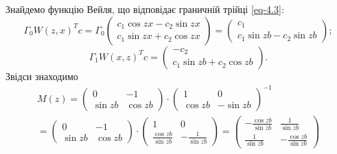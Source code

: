 \begin{example}
	Знайдемо функцію Вейля, що відповідає граничній трійці \eqref{eq-4.3}:
	\begin{equation*}
		\Gamma_0W(z,x)^T c = \Gamma_0
		\begin{pmatrix}
	  		c_1 \cos{zx} - c_2 \sin{zx}\\
	  		c_1 \sin{zx} + c_2 \cos{zx}
	  	\end{pmatrix}
	  	=
	  	\begin{pmatrix}
	  		c_1\\
	  		c_1 \sin{zb} - c_2 \sin{zb}
	  	\end{pmatrix};
	\end{equation*}
	\begin{equation*}
		\Gamma_1W(x,z)^T c = 
		\begin{pmatrix}
	  		-c_2\\
	  		c_1\sin{zb} + c_2 \cos{zb}
	  	\end{pmatrix}.
	\end{equation*}
	Звідси знаходимо
	\begin{multline}\label{eq-4.27}
		M(z) = 
		\begin{pmatrix}
	  		0 & -1\\
	  		\sin{zb} & \cos{zb}
	  	\end{pmatrix}
	  	\cdot
	  	\begin{pmatrix}
	  		1 & 0\\
	  		\cos{zb} & -\sin{zb}
	  	\end{pmatrix}^{-1}
	  	\\=
	  	\begin{pmatrix}
	  		0 & -1\\
	  		\sin{zb} & \cos{zb}
	  	\end{pmatrix}
	  	\cdot
	  	\begin{pmatrix}
	  		1 & 0\\
	  		\frac{\cos{zb}}{\sin{zb}} & -\frac{1}{\sin{zb}}
	  	\end{pmatrix}
	  	=
	  	\begin{pmatrix}
 	  		-\frac{\cos{zb}}{\sin{zb}} & \frac{1}{\sin{zb}}\\
	  		\frac{1}{\sin{zb}} & -\frac{\cos{zb}}{\sin{zb}}
	  	\end{pmatrix}
	\end{multline}
\end{example}

